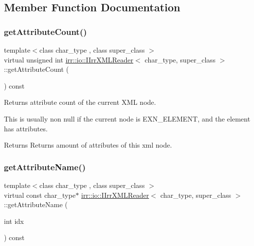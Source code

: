 \subsection{Member Function Documentation}
\mbox{\label{classirr_1_1io_1_1IIrrXMLReader_a8f85253d2efb15061facdb9571b9c549}} 
\subsubsection{\texorpdfstring{get\+Attribute\+Count()}{getAttributeCount()}}
{\footnotesize\ttfamily template$<$class char\+\_\+type , class super\+\_\+class $>$ \\
virtual unsigned int \hyperlink{classirr_1_1io_1_1IIrrXMLReader}{irr\+::io\+::\+I\+Irr\+X\+M\+L\+Reader}$<$ char\+\_\+type, super\+\_\+class $>$\+::get\+Attribute\+Count (\begin{DoxyParamCaption}{ }\end{DoxyParamCaption}) const\hspace{0.3cm}{\ttfamily [pure virtual]}}



Returns attribute count of the current X\+ML node. 

This is usually non null if the current node is E\+X\+N\+\_\+\+E\+L\+E\+M\+E\+NT, and the element has attributes. \begin{DoxyReturn}{Returns}
Returns amount of attributes of this xml node. 
\end{DoxyReturn}
\mbox{\label{classirr_1_1io_1_1IIrrXMLReader_aa0807dc565c67fcf355e656df1a326ef}} 
\subsubsection{\texorpdfstring{get\+Attribute\+Name()}{getAttributeName()}}
{\footnotesize\ttfamily template$<$class char\+\_\+type , class super\+\_\+class $>$ \\
virtual const char\+\_\+type$\ast$ \hyperlink{classirr_1_1io_1_1IIrrXMLReader}{irr\+::io\+::\+I\+Irr\+X\+M\+L\+Reader}$<$ char\+\_\+type, super\+\_\+class $>$\+::get\+Attribute\+Name (\begin{DoxyParamCaption}\item[{int}]{idx }\end{DoxyParamCaption}) const\hspace{0.3cm}{\ttfamily [pure virtual]}}



